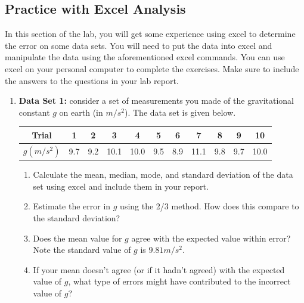 \subsection{Practice with Excel Analysis}
In this section of the lab, you will get some experience using excel to determine the error on some data sets. You will need to put the data into excel and manipulate the data using the aforementioned excel commands. You can use excel on your personal computer to complete the exercises. Make sure to include the answers to the questions in your lab report.
\begin{enumerate}

\item {\bf{Data Set 1:}} consider a set of measurements you made of the gravitational constant $g$ on earth (in $m/s^2$). The data set is given below.
\begin{center}
\begin{tabular}{| c | c | c | c | c | c | c | c | c | c | c |}
\hline
Trial &1&2&3&4&5&6&7&8&9&10 \\ \hline
$g (m/s^2)$&9.7&9.2&10.1&10.0&9.5&8.9&11.1&9.8&9.7&10.0 \\
\hline
\end{tabular}
\end{center}
\begin{enumerate}
\item Calculate the mean, median, mode, and standard deviation of the data set using excel and include them in your report.
\item Estimate the error in $g$ using the 2/3 method. How does this compare to the standard deviation?
\item Does the mean value for $g$ agree with the expected value within error? Note the standard value of $g$  is $9.81 m/s^2$.
\item If your mean doesn't agree (or if it hadn't agreed) with the expected value of $g$, what type of errors might have contributed to the incorrect value of $g$?
\end{enumerate}


\end{enumerate}
